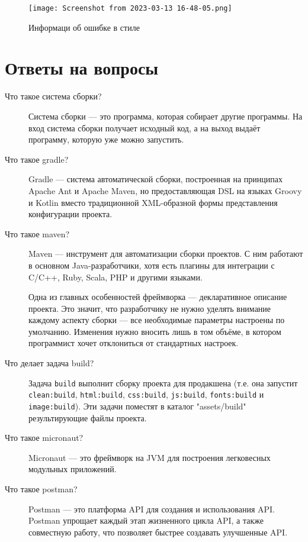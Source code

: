 \begin{figure}[h!tp]
	\centering
	\texttt{[image: Screenshot from 2023-03-13 16-48-05.png]}
	\caption{Информаци об ошибке в стиле}
	\label{fig:gradle:checkstyle:rep:f}
\end{figure}

\clearpage

\chapter*{Ответы на вопросы}

\begin{description}
	\item[Что такое система сборки?]
		Система сборки --- это программа, которая собирает другие программы.
		На вход система сборки получает исходный код, а на выход выдаёт
		программу, которую уже можно запустить.
	\item[Что такое gradle?]
		Gradle --- система автоматической сборки, построенная на принципах
		Apache Ant и Apache Maven, но предоставляющая DSL на языках
		Groovy и Kotlin вместо традиционной XML-образной формы представления
		конфигурации проекта.
	\item[Что такое maven?]
		Maven --- инструмент для автоматизации сборки проектов.
		С ним работают в основном Java-разработчики, хотя есть плагины
		для интеграции с C/C++, Ruby, Scala, PHP и другими языками.\par
		Одна из главных особенностей фреймворка --- декларативное описание
		проекта. Это значит, что разработчику не нужно уделять внимание
		каждому аспекту сборки --- все необходимые параметры настроены
		по умолчанию. Изменения нужно вносить лишь в том объёме,
		в котором программист хочет отклониться от стандартных настроек.
	\item[Что делает задача build?]
		Задача \texttt{build} выполнит сборку проекта для продакшена
		(т.е. она запустит \texttt{clean:build}, \texttt{html:build},
		\texttt{css:build}, \texttt{js:build}, \texttt{fonts:build}
		и \texttt{image:build}). Эти задачи поместят
		в каталог "assets/build" результирующие файлы проекта.
	\item[Что такое micronaut?]
		Micronaut --- это фреймворк на JVM для построения легковесных
		модульных приложений.
	\item[Что такое postman?]
		Postman --- это платформа API для создания и использования API.
		Postman упрощает каждый этап жизненного цикла API, а также совместную
		работу, что позволяет быстрее создавать улучшенные API.
\end{description}

